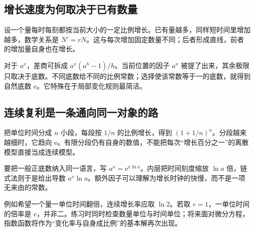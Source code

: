 \subsection*{增长速度为何取决于已有数量}
设一个量每时每刻都按当前大小的一定比例增长。已有量越多，同样短时间里增加越多，数学关系是 $N'=rN$。这与每次增加固定数量不同；后者形成直线，前者的增加量自身也在增长。

对于 $a^x$，差商可拆成 $a^x(a^h-1)/h$。当前位置的因子 $a^x$ 被提了出来，其余极限只取决于底数。不同底数给不同的比例常数；选择使该常数等于一的底数，就得到自然底数 $\mathrm e$。它特殊在于局部变化规则最简洁。

\subsection*{连续复利是一条通向同一对象的路}
把单位时间分成 $n$ 小段，每段按 $1/n$ 的比例增长，得到 $(1+1/n)^n$。分段越来越细时，它趋向 $\mathrm e$。有限分段仍有自身的数值，不能把每次“增长百分之一”的离散模型直接当成连续模型。

要把一般正底数纳入同一语言，写 $a^x=\mathrm e^{x\ln a}$。内层把时间刻度缩放 $\ln a$ 倍，链式法则于是给出导数 $a^x\ln a$。额外因子可以理解为增长时钟的快慢，而不是一项无来由的常数。

例如希望一个量一单位时间翻倍，连续增长率应取 $\ln2$。若取 $r=1$，一单位时间的倍率是 $\mathrm e$，并非二。练习时同时检查数量单位与时间单位；将来面对微分方程，指数函数将作为“变化率与自身成比例”的基本解再次出现。
